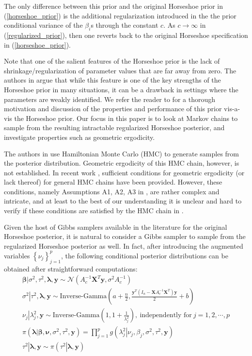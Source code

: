 \documentclass[noinfoline,11pt]{imsart}
\numberwithin{equation}{section}
\theoremstyle{plain}
\newcommand{\y}{\mathbf{y}}
\newcommand{\X}{\mathbf{X}}
\newcommand{\bb}{\boldsymbol{\beta}}
\newcommand{\bl}{\boldsymbol{\lambda}}
\begin{document}
\noindent
The only difference between this prior and the original Horseshoe prior 
in (\ref{horseshoe_prior}) is the additional regularization introduced in 
the the prior conditional variance of the $\beta_i$s through the constant $c$. As $c \rightarrow \infty$ in (\ref{regularized_prior}), then one reverts back to the 
original Horseshoe specification in (\ref{horseshoe_prior}). 

Note that one of the salient features of the Horseshoe prior is the lack of shrinkage/regularization of parameter values that are far away from zero. The authors in \cite{piironen2017} argue that while this feature is one of the key strengths of the Horseshoe prior in many situations, it can be a drawback in settings where the parameters are weakly identified. We refer the reader to \cite{piironen2017} for a thorough motivation and discussion of the properties and performance of this prior vis-a-vis the Horseshoe prior. Our focus in this paper is to look at Markov chains to sample from the resulting intractable regularized Horseshoe posterior, and investigate properties such as geometric ergodicity. 

The authors in \cite{piironen2017} use Hamiltonian Monte Carlo (HMC) to generate samples from the posterior distribution. Geometric ergodicity of this HMC chain, however, is not established. In recent work \cite{livingstone2019}, sufficient conditions for geometric ergodicity (or lack thereof) for general HMC chains have been provided. However, these conditions, namely Assumptions A1, A2, A3 in \cite{livingstone2019}, are rather complex and intricate, and at least to the best of our understanding it is unclear and hard to verify if these conditions are satisfied by the HMC chain in \cite{piironen2017}. 

Given the host of Gibbs samplers available in the literature for the original Horseshoe posterior, it is natural to consider a Gibbs sampler to sample from the regularized Horseshoe posterior as well. In fact, after introducing the augmented variables $\left\{\nu_j\right\}_{j=1}^p$, the following conditional posterior distributions can be obtained after straightforward computations:
\begin{eqnarray}\label{reghorseshoeposteriors}
\left.\bb\right|\sigma^2,\tau^2,\bl,\y\sim\mathcal{N}\left(A_c^{-1}\X^T\y,\sigma^2A_c^{-1}\right)\nonumber \\
\left.\sigma^2\right|\tau^2,\bl,\y\sim \text{Inverse-Gamma}\left(a+\frac{n}{2},\frac{\y^T\left(I_n-\X A_c^{-1}\X^T\right)\y}{2}+b\right)\nonumber \\
\left.\nu_j\right|\lambda_j^2,\y\sim\text{Inverse-Gamma}\left(1,1+\frac{1}{\lambda_j^2}\right),\ \text{independently for}\ j=1,2,\cdots,p\nonumber \\
 \pi \left(\left.\mathbf{\bl}\right|\boldsymbol{\beta,\nu},\sigma^2,\tau^2,\mathbf{\y}\right)=\prod\limits_{j=1}^p g\left(\left.\lambda_j^2\right|\nu_j,\beta_j,\sigma^2,\tau^2,\y\right) 
 \nonumber\\
\left.\tau^2\right|\bl,\y\sim\pi\left(\left.\tau^2\right|\bl,\y\right)
\label{regularized_posterior}
\end{eqnarray}
\end{document}
